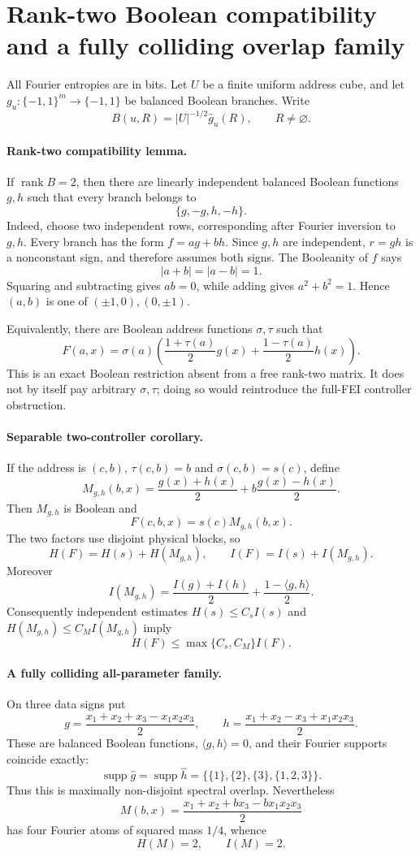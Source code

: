 \section*{Rank-two Boolean compatibility and a fully colliding overlap family}

All Fourier entropies are in bits.  Let $U$ be a finite uniform address
cube, and let $g_u:\{-1,1\}^m\to\{-1,1\}$ be balanced Boolean branches.
Write
\[
 B(u,R)=|U|^{-1/2}\widehat g_u(R),\qquad R\ne\varnothing.
\]

\paragraph{Rank-two compatibility lemma.}
If $\operatorname{rank}B=2$, then there are linearly independent balanced
Boolean functions $g,h$ such that every branch belongs to
\[
 \{g,-g,h,-h\}.
\]
Indeed, choose two independent rows, corresponding after Fourier inversion
to $g,h$.  Every branch has the form $f=ag+bh$.  Since $g,h$ are
independent, $r=gh$ is a nonconstant sign, and therefore assumes both signs.
The Booleanity of $f$ says
\[
 |a+b|=|a-b|=1.
\]
Squaring and subtracting gives $ab=0$, while adding gives
$a^2+b^2=1$.  Hence $(a,b)$ is one of $(\pm1,0),(0,\pm1)$.

Equivalently, there are Boolean address functions $\sigma,\tau$ such that
\[
 F(a,x)=\sigma(a)\left(\frac{1+\tau(a)}2g(x)
                         +\frac{1-\tau(a)}2h(x)\right).
\]
This is an exact Boolean restriction absent from a free rank-two matrix.
It does not by itself pay arbitrary $\sigma,\tau$; doing so would reintroduce
the full-FEI controller obstruction.

\paragraph{Separable two-controller corollary.}
If the address is $(c,b)$, $\tau(c,b)=b$ and $\sigma(c,b)=s(c)$, define
\[
 M_{g,h}(b,x)=\frac{g(x)+h(x)}2
             +b\frac{g(x)-h(x)}2.
\]
Then $M_{g,h}$ is Boolean and
\[
 F(c,b,x)=s(c)M_{g,h}(b,x).
\]
The two factors use disjoint physical blocks, so
\[
 H(F)=H(s)+H(M_{g,h}),\qquad
 I(F)=I(s)+I(M_{g,h}).
\]
Moreover
\[
 I(M_{g,h})=\frac{I(g)+I(h)}2+\frac{1-\langle g,h\rangle}{2}.
\]
Consequently independent estimates $H(s)\le C_sI(s)$ and
$H(M_{g,h})\le C_MI(M_{g,h})$ imply
\[
 H(F)\le\max\{C_s,C_M\}I(F).
\]

\paragraph{A fully colliding all-parameter family.}
On three data signs put
\[
 g=\frac{x_1+x_2+x_3-x_1x_2x_3}{2},\qquad
 h=\frac{x_1+x_2-x_3+x_1x_2x_3}{2}.
\]
These are balanced Boolean functions, $\langle g,h\rangle=0$, and their
Fourier supports coincide exactly:
\[
 \operatorname{supp}\widehat g=\operatorname{supp}\widehat h
 =\{\{1\},\{2\},\{3\},\{1,2,3\}\}.
\]
Thus this is maximally non-disjoint spectral overlap.  Nevertheless
\[
 M(b,x)=\frac{x_1+x_2+bx_3-bx_1x_2x_3}{2}
\]
has four Fourier atoms of squared mass $1/4$, whence
\[
 H(M)=2,\qquad I(M)=2.
\]

